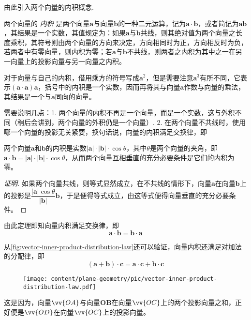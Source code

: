 由此引入两个向量的内积概念.
\begin{definition}
  两个向量的 \emph{内积} 是两个向量$\bm{a}$与向量$\bm{b}$的一种二元运算，记为$\bm{a} \cdot \bm{b}$，或者简记为$\bm{a}\bm{b}$，其结果是一个实数，其值规定为：如果$\bm{a}$与$\bm{b}$共线，则其绝对值为两个向量之长度乘积，其符号则由两个向量的方向来决定，方向相同时为正，方向相反时为负，若两者中有零向量，则内积为零；若$\bm{a}$与$\bm{b}$不共线，则两者之内积为其中之一在另一向量上的投影向量与另一向量之内积。
\end{definition}

对于向量与自己的内积，借用乘方的符号写成$\bm{a}^2$，但是需要注意$\bm{a}^3$有所不同，它表示$(\bm{a} \cdot \bm{a})\bm{a}$，括号中的内积是一个实数，因而再将其与向量$\bm{a}$作数与向量的乘法，其结果是一个与$\bm{a}$同向的向量。

需要说明几点：1. 两个向量的内积不再是一个向量，而是一个实数，这与外积不同（稍后会讲到，两个向量的外积仍是一个向量）. 2. 在两个向量不共线时，使用哪一个向量的投影无关紧要，换句话说，向量的内积满足交换律，即
\begin{theorem}
两个向量$\bm{a}$和$\bm{b}$的内积是实数$|\bm{a}| \cdot |\bm{b}| \cdot \cos{\theta}$，其中$\theta$是两个向量的夹角，即$\bm{a} \cdot \bm{b} = |\bm{a}| \cdot |\bm{b}| \cdot \cos{\theta}$，从而两个向量互相垂直的充分必要条件是它们的内积为零。
\end{theorem}

\begin{proof}[证明]
  如果两个向量共线，则等式显然成立，在不共线的情形下，向量$\bm{a}$在向量$\bm{b}$上的投影是$\dfrac{|\bm{a}|\cos{\theta}}{|\bm{b}|} \bm{b}$，于是便得等式成立，由这等式便得向量垂直的充分必要条件。
\end{proof}

由此定理即知向量内积满足交换律，即
\[ \bm{a} \cdot \bm{b} = \bm{b} \cdot \bm{a} \]

从\autoref{fig:vector-inner-product-distribution-law}还可以验证，向量内积还满足对加法的分配律，即
\[ (\bm{a}+\bm{b}) \cdot \bm{c} = \bm{a} \cdot \bm{c} + \bm{b} \cdot \bm{c} \] 

\begin{figure}[htbp]
\centering
\texttt{[image: content/plane-geometry/pic/vector-inner-product-distribution-law.pdf]}
\caption{}
\label{fig:vector-inner-product-distribution-law}
\end{figure}

这是因为，向量$\vv{OA}$与向量$\bm{OB}$在向量$\vv{OC}$上的两个投影向量之和，正好便是$\vv{OD}$在向量$\vv{OC}$上的投影向量。

